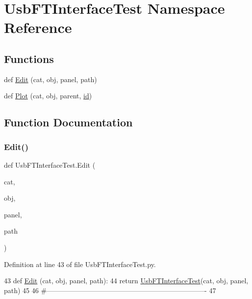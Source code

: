 \hypertarget{namespaceUsbFTInterfaceTest}{}\section{Usb\+F\+T\+Interface\+Test Namespace Reference}
\label{namespaceUsbFTInterfaceTest}
\subsection*{Functions}
\begin{DoxyCompactItemize}
\item 
def \hyperlink{namespaceUsbFTInterfaceTest_a35b8c3ee059d54e7722d0ad7a957c83c}{Edit} (cat, obj, panel, path)
\item 
def \hyperlink{namespaceUsbFTInterfaceTest_a3a50ab3c7d8a3428d3b89c0dee71f7c6}{Plot} (cat, obj, parent, \hyperlink{classObject_af99145335cc61ff6e2798ea17db009d2}{id})
\end{DoxyCompactItemize}


\subsection{Function Documentation}
\mbox{\label{namespaceUsbFTInterfaceTest_a35b8c3ee059d54e7722d0ad7a957c83c}} 
\subsubsection{\texorpdfstring{Edit()}{Edit()}}
{\footnotesize\ttfamily def Usb\+F\+T\+Interface\+Test.\+Edit (\begin{DoxyParamCaption}\item[{}]{cat,  }\item[{}]{obj,  }\item[{}]{panel,  }\item[{}]{path }\end{DoxyParamCaption})}



Definition at line 43 of file Usb\+F\+T\+Interface\+Test.\+py.


\begin{DoxyCode}
43 \textcolor{keyword}{def }\hyperlink{namespaceUsbFTInterfaceTest_a35b8c3ee059d54e7722d0ad7a957c83c}{Edit} (cat, obj, panel, path):
44     \textcolor{keywordflow}{return} \hyperlink{classUsbFTInterfaceTest}{UsbFTInterfaceTest}(cat, obj, panel, path)
45 
46 \textcolor{comment}{#----------------------------------------------------------------------}
47 
\end{DoxyCode}
\mbox{\label{namespaceUsbFTInterfaceTest_a3a50ab3c7d8a3428d3b89c0dee71f7c6}} 
